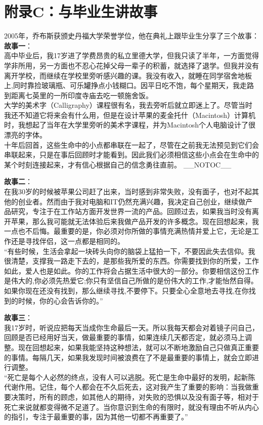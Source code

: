 \chapter{附录C：与毕业生讲故事} %

2005年，乔布斯获颁史丹福大学荣誉学位，他在典礼上跟毕业生分享了三个故事：\\
\textbf{故事一}：\\
高中毕业后，我17岁进了学费昂贵的私立里德大学，但我只读了半年，一方面觉得学非所用，另一方面也不忍心花掉父母一辈子的积蓄，就选择了退学。但我并没有离开学校，而继续在学校里旁听感兴趣的课。我没有收入，就睡在同学宿舍地板上,同时靠捡玻璃瓶、可乐罐挣点小钱糊口。因平日吃不饱，每个星期天，我走路到距离七英里的一所印度寺庙去吃一顿施舍饭。\\
大学的美术字（Calligraphy）课程很有名，我去旁听后就立即迷上了。尽管当时我还不知道它将来会有什么用，但是在设计苹果的麦金托什（Macintosh）计算机时，我想起了当年在大学里旁听的美术字课程，并为Macintosh个人电脑设计了很漂亮的字体。\\
十年后回首，这些生命中的小点都串联在一起了，尽管在之前我无法预见到它们会串联起来，只是在事后回顾时才能看到。因此我们必须相信这些小点会在生命中的某个时刻连接起来，才有信心根据自己的信念勇往直前。
\_\_NOTOC\_\_

\textbf{故事二}：\\
在我30岁的时候被苹果公司赶了出来，当时感到非常失败，没有面子，也对不起其他的创业者。然而由于我对电脑和IT仍然充满兴趣，我决定自己创业，继续做产品研究，专注于在工作站方面开发世界一流的产品。回顾过去，如果我当时没有离开苹果，那么我可能就无法体验后来我做产品开发的许多概念。现在回想起来，我一点也不后悔。最重要的是，你必须对你所做的事情充满热情并爱上它，无论是工作还是寻找伴侣，这一点都是相同的。\\
``有些时候，生活会拿起一块砖头向你的脑袋上猛拍一下，不要因此失去信仰。我很清楚，支撑我一路走下去的，是那些我所爱的东西。你需要找到你的所爱，工作如此，爱人也是如此。你的工作将会占据生活中很大的一部分。你要相信这份工作是伟大的,你必须先热爱它;你只有坚信自己所做的是份伟大的工作,才能怡然自得。如果你现在还没有找到，那么继续寻找,不要停下。只要全心全意地去寻找,在你找到的时候，你的心会告诉你的。''

\textbf{故事三}：\\
我17岁时，听说应把每天当成你生命最后一天。所以我每天都会对着镜子问自己，回顾是否已经用好当天，做最重要的事情，如果连续几天都否定，就必须马上调整。现在回想起来，如果我能坚持这种想法，就可以不断地激励自己只做真正重要的事情。每隔几天，如果我发现时间被浪费在了不是最重要的事情上，就会立即进行调整。\\
``死亡是每个人必然的终点，没有人可以逃脱。死亡是生命中最好的发明，起新陈代谢作用。记住，每个人都会在不久后死去，这对我产生了重要的影响：当我做重要决策时，所有的顾虑，如其他人的期待，对失败的恐惧以及没有面子等，相对于死亡来说就都变得微不足道了。当你意识到生命的有限时，就没有理由不听从内心的指引，专注于最重要的事，因为其他一切都不再重要了。''

